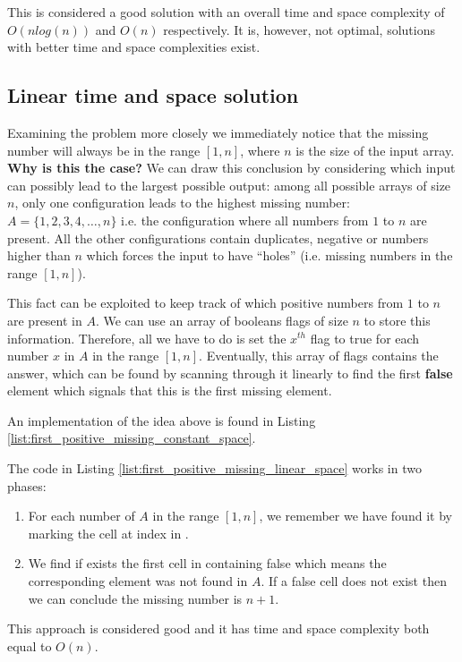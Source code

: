 This is considered a good solution with an overall time and space complexity of $O(nlog(n))$ and $O(n)$ respectively. It is, however, not optimal, solutions with better time and space complexities exist.  


\subsection{Linear time and space solution}
\label{first_positive_missing:sec:linear_space}

Examining the problem more closely  we immediately notice that the missing number will always be
in the range $[1,n]$, where $n$ is the size of the input array. \textbf{Why is this the case?}
We can draw this conclusion by considering which input can possibly lead to the largest possible output: among
all possible arrays of size $n$, only one configuration leads to the highest missing number: $A =
\{1,2,3,4, \ldots ,n\}$ i.e. the configuration where all numbers from $1$ to $n$ are present. All the other configurations contain duplicates,
negative or numbers higher than $n$ which forces the input to have ``holes'' (i.e. missing numbers in the range $[1,n]$). 

This fact can be exploited to keep track of which positive numbers from
$1$ to $n$ are present in $A$. We can use an array of booleans flags of size $n$ to store this information. Therefore, all we have to do is set the $x^{th}$ flag to true for each number  $x$ in $A$ in the range $[1,n]$.
Eventually, this array of flags contains the answer, which can be found by scanning through it linearly to find the first \textbf{false} element which signals that this is the first missing element.

An implementation of the idea above is found in Listing \ref{list:first_positive_missing_constant_space}.




The code in Listing \ref{list:first_positive_missing_linear_space} works in two phases:
\begin{enumerate}
	\item For each number  of $A$ in the range $[1,n]$, we remember we have found it by marking the cell at index  in .
	\item We find if exists the first cell in  containing false which means the corresponding element was not found in $A$. If a false cell does not exist then we can conclude the missing number is $n+1$.
\end{enumerate}
This approach is considered good and it has time and space complexity both equal to $O(n)$.

